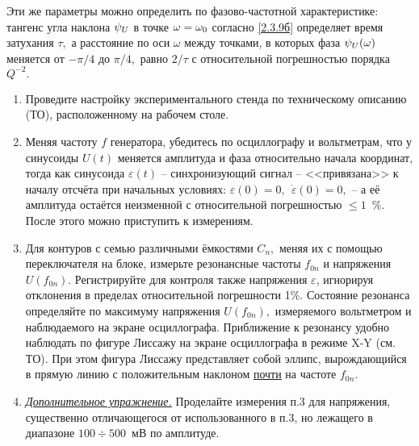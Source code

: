 Эти же параметры можно определить по фазово-частотной характеристике: тангенс угла наклона $\psi_{\sc{U}}$ в точке $\omega=\omega_{\sc{0}}$ согласно \eqref{2.3.9б} определяет время затухания $\tau,$ а расстояние по оси $\omega$ между точками, в которых фаза $\psi_{\sc{U}}(\omega)$ меняется от $-\pi/4$ до $\pi/4,$ равно $2/\tau$ с относитель\-ной погрешностью порядка $Q^{-2}.$




\begin{lab:task}
	\begin{enumerate}
    \item Проведите настройку экспериментального стенда по техническому описанию (ТО), расположенному на рабочем столе.

    \item Меняя частоту $f$ генератора, убедитесь по осциллографу и вольтметрам, что у синусоиды $U(t)$ меняется амплитуда и фаза относительно начала координат, тогда как синусоида $\varepsilon(t)$ – синхронизующий сигнал – <<привязана>> к началу отсчёта при начальных условиях: $\varepsilon(0)=0,~~\dot{\varepsilon}(0)=0,$ – а её амплитуда остаётся неизменной с относительной погрешностью  $\le1$~\%. После этого можно приступить к измерениям.

    \item Для контуров с семью различными ёмкостями $C_n,$ меняя их с помощью переключателя на блоке, измерьте резонансные частоты $f_{0n}$ и напряжения $U(f_{0n}).$ Регистрируйте для контроля также напряжения $\varepsilon$, игнорируя отклонения в пределах относительной погрешности 1\%. Состояние резонанса определяйте по максимуму напряжения $U(f_{0n}),$ измеряемого вольтметром и наблюдаемого на экране осциллографа. Приближение к резонансу удобно наблюдать по фигуре Лиссажу на экране осциллографа в режиме X-Y (см. ТО). При этом фигура Лиссажу представляет собой эллипс, вырождающийся в прямую линию с положительным наклоном \underline{почти} на частоте $f_{0n}.$

    \item \emph{\underline{Дополнительное упражнение.}} Проделайте измерения п.3 для напряжения, существенно отличающегося от использованного в п.3, но лежащего в диапазоне $100\div500$~мВ по амплитуде.


\end{enumerate}
\end{lab:task}
